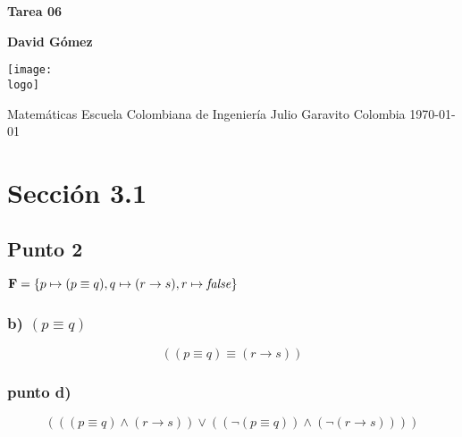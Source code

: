 \documentclass{article}
\newcommand{\logo}{C:/Users/usuario/Documents/U/logo-eci.jpg}
\newcommand{\titlename}{Tarea 06}%
\newlength{\logicv}
\newenvironment{logicenv}[2][0]{
  \begin{tcolorbox}[demo, title = #2]
  \vspace*{#1\logicv}
}{
  \end{tcolorbox}
  \vspace*{-.5cm}
}
\begin{document}

\begin{titlepage}
    \begin{center}
        \vspace*{1cm}

        \textbf{\Huge{\titlename}}

        \vspace{1.5cm}

        \textbf{\large{David Gómez}}

        \vspace{4cm}

        \texttt{[image: \\logo]}

        \vspace{5cm}

        Matemáticas\linebreak
        Escuela Colombiana de Ingeniería Julio Garavito\linebreak
        Colombia\linebreak
        \today

    \end{center}
\end{titlepage}
\clearpage
\tableofcontents
\clearpage

\section{Sección 3.1}
\subsection{Punto 2}
$\mathbf{F} = \{p \mapsto (p \equiv q), q \mapsto (r \to s), r \mapsto \textrm{\textit{false}}\}$
\subsubsection{b) $(p \equiv q)$}

\begin{logicenv}{punto b)}
    $$((p \equiv q) \equiv (r \to s))$$
\end{logicenv}

\subsubsection{punto d)}

\begin{logicenv}{punto d)}
    $$(((p \equiv q) \land (r \to s)) \lor ((\neg(p \equiv q)) \land (\neg(r \to s))))$$
\end{logicenv}
\end{document}
